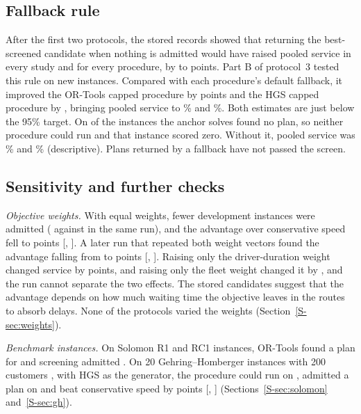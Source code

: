 \documentclass{itor}
\newcommand{\SI}[1]{Section~\ref{S-#1}}
\begin{document}
\subsection{Fallback rule}

After the first two protocols, the stored records showed that returning the
best-screened candidate when nothing is admitted would have raised pooled
service in every study and for every procedure, by \FbGainMin{} to
\FbGainMax{} points. Part B of protocol~3 tested this rule on \PbInstances{} new
instances. Compared with each procedure's default fallback, it improved the
OR-Tools capped procedure by \PbFOne{} points and the HGS capped procedure by
\PbFTwo{}, bringing pooled service to \PbFThree\% and \PbFFour\%. Both estimates
are just below the 95\% target. On \PbNoAnchor{} of the \PbInstances{} instances
the anchor solves found no plan, so neither procedure could run and that
instance scored zero.
Without it, pooled service was \PbExOrt\% and \PbExHgs\% (descriptive). Plans
returned by a fallback have not passed the screen.

\subsection{Sensitivity and further checks}\label{sec:checks}

\emph{Objective weights.} With equal weights, fewer development instances were
admitted (\WtEqualAdmitted{} against \WtBaseAdmitted{} in the same run), and the
advantage over conservative speed fell to \WtEqualPCMean{} points
[\WtEqualPCLo, \WtEqualPCHi]. A later run that repeated both weight vectors
found the advantage falling from \BrOrigAdv{} to \BrEqAdv{} points
[\BrEqAdvLo, \BrEqAdvHi]. Raising only the driver-duration weight changed
service by \BrDurDiff{} points, and raising only the fleet weight changed it by
\BrFleetDiff{}, and the run cannot separate the two effects. The stored
candidates suggest that the advantage depends on how much waiting time the
objective leaves in the routes to absorb delays. None of the protocols varied
the weights (\SI{sec:weights}).

\emph{Benchmark instances.} On \SolomonN{} Solomon R1 and RC1 instances,
OR-Tools found a plan for \SolomonPlans{} and screening admitted
\SolomonAdmitted{}. On 20 Gehring--Homberger instances with 200 customers
\citep{gehring1999}, with HGS as the generator, the procedure could run on
\GhAttempted{}, admitted a plan on \GhAdmitted{} and beat conservative speed by
\GhDiff{} points [\GhDiffLo, \GhDiffHi] (Sections~\ref{S-sec:solomon}
and~\ref{S-sec:gh}).
\end{document}
